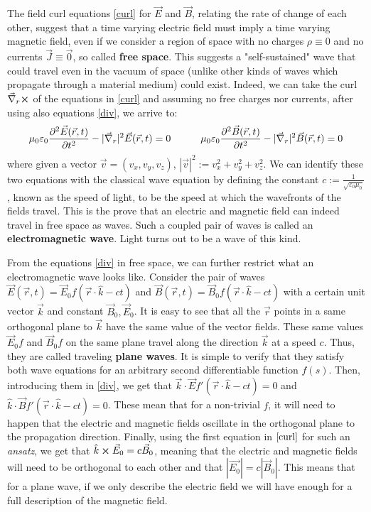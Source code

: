 \documentclass[11pt, a4paper, twoside]{article} %
\begin{document}
The field curl equations \eqref{curl} for $\vec{E}$ and $\vec{B}$, relating the rate of change of each other, suggest that a time varying electric field must imply a time varying magnetic field, even if we consider a region of space with no charges $\rho\equiv 0$ and no currents $\vec{J}\equiv\vec{0}$, so called {\bf free space}. This suggests a "self-sustained" wave that could travel even in the vacuum of space (unlike other kinds of waves which propagate through a material medium) could exist. Indeed, we can take the curl $\vec{\nabla}_r\cross$ of the equations in \eqref{curl} and assuming no free charges nor currents, after using also equations \eqref{div}, we arrive to:\vspace{-0.2cm}
\begin{equation}\label{waveeq}
\mu_0\varepsilon_0\pdv[2]{\vec{E}(\vec{r},t)}{t}-|\vec{\nabla}_r|^2\vec{E}(\vec{r},t)=0 \quad \quad \quad \mu_0\varepsilon_0\pdv[2]{\vec{B}(\vec{r},t)}{t}- |\vec{\nabla}_r|^2\vec{B}(\vec{r},t)=0 \vspace{-0.2cm}
\end{equation}
where given a vector $\vec{v}=(v_x,v_y,v_z)$, $|\vec{v}|^2:=v_x^2+v_y^2+v_z^2$. We can identify these two equations with the classical wave equation by defining the constant $c:=\frac{1}{\sqrt{\varepsilon_0\mu_0}}$, known as the speed of light, to be the speed at which the wavefronts of the fields travel. This is the prove that an electric and magnetic field can indeed travel in free space as waves. Such a coupled pair of waves is called an {\bf electromagnetic wave}. Light turns out to be a wave of this kind.

From the equations \eqref{div} in free space, we can further restrict what an electromagnetic wave looks like. Consider the pair of waves $\vec{E}(\vec{r},t)=\vec{E}_0f(\vec{r}\cdot \hat{k}-ct)$ and $\vec{B}(\vec{r},t)=\vec{B}_0f(\vec{r}\cdot \hat{k}-ct)$ with a certain unit vector $\vec{k}$ and constant $\vec{B}_0,\vec{E}_0$. It is easy to see that all the $\vec{r}$ points in a same orthogonal plane to $\vec{k}$ have the same value of the vector fields. These same values $\vec{E}_0f$ and $\vec{B}_0f$ on the same plane travel along the direction $\vec{k}$ at a speed $c$. Thus, they are called traveling {\bf plane waves}. It is simple to verify that they satisfy both wave equations for an arbitrary second differentiable function $f(s)$. Then, introducing them in \eqref{div}, we get that $\vec{k}\cdot\vec{E}f'(\vec{r}\cdot \hat{k}-ct)=0$ and $\hat{k}\cdot\vec{B}f'(\vec{r}\cdot \hat{k}-ct)=0$. These mean that for a non-trivial $f$, it will need to happen that the electric and magnetic fields oscillate in the orthogonal plane to the propagation direction. Finally, using the first equation in $\eqref{curl}$ for such an {\em ansatz}, we get that $\hat{k}\cross \vec{E}_0 =c \vec{B}_0$, meaning that the electric and magnetic fields will need to be orthogonal to each other and that $|\vec{E_0}|=c|\vec{B}_0|$. This means that for a plane wave, if we only describe the electric field we will have enough for a full description of the magnetic field. 
\end{document}
